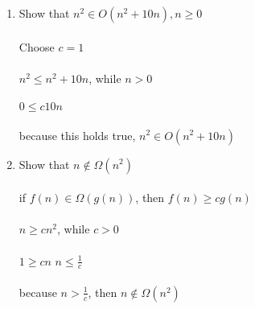 \documentclass[12pt]{article}
\newcommand\tab[1][1cm]{\hspace*{#1}}
\begin{document}
\begin {enumerate}
\begin {enumerate}[(a)]
	\end {enumerate}
\item Show that $n^{2} \in O(n^{2}+10n), n \geq 0$ \\ \\
	\tab Choose $c=1$ \\ \\
	\tab $n^{2} \leq n^{2} + 10n$, while $n>0$ \\ \\
	\tab \implies $0 \leq c10n$ \\ \\ 
	\tab because this holds true, $n^{2} \in O(n^{2}+10n)$
\item Show that $n \not\in \Omega(n^{2})$ \\ \\
	\tab if $f(n) \in \Omega(g(n))$, then $f(n) \geq cg(n)$ \\ \\
	\tab \implies $n \geq cn^{2}$, while $c>0$ \\ \\
	\tab \implies $1 \geq cn$ \implies $n\leq\frac{1}{c}$ \\ \\
	\tab because $n>\frac{1}{c}$, then $n \not\in \Omega(n^{2})$
\end {enumerate}
\end{document}
